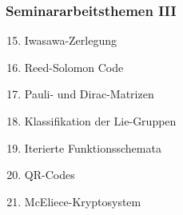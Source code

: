 %
%
%

\begin{frame}
\frametitle{Seminararbeitsthemen III}
\begin{enumerate}[<+->]
\setcounter{enumi}{14}
\item
Iwasawa-Zerlegung
\item 
Reed-Solomon Code
\item
Pauli- und Dirac-Matrizen
\item
Klassifikation der Lie-Gruppen
\item
Iterierte Funktionsschemata
\item
QR-Codes
\item
McEliece-Kryptosystem
\end{enumerate}
\end{frame}
